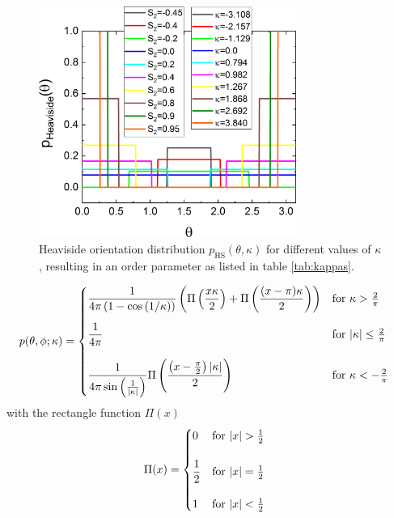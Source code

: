 \begin{figure}[htb]
\includegraphics[width=0.75\textwidth]{../images/form_factor/cylindrical_obj/pHeavisideGr.png}
\caption{Heaviside orientation distribution $p_\mathrm{HS}(\theta,\kappa)$ for different values of $\kappa$, resulting in an order parameter as listed in table \ref{tab:kappas}.}
\label{fig:pHeavisideGr}
\end{figure}


\begin{align}
p(\theta,\phi;\kappa) & =
\begin{cases}
\displaystyle
\frac{1}{4\pi\left(1-\cos\left(1/\kappa\right)\right)}\left(\Pi\left(\frac{x\kappa}{2}\right) + \Pi\left(\frac{(x-\pi)\kappa}{2}\right)\right)
 & \mathrm{for~} \kappa >  \frac{2}{\pi}
 \\[5mm]
\displaystyle
 \frac{1}{4\pi} & \mathrm{for~}  \abs{\kappa} \leq \frac{2}{\pi}
 \\[5mm]
\displaystyle
 \frac{1}{4\pi\sin\left(\frac{1}{\abs{\kappa}}\right)} \Pi\left(\frac{\left(x-\frac{\pi}{2}\right)\abs{\kappa}}{2}\right) & \mathrm{for~}  \kappa<-\frac{2}{\pi}
\end{cases}
\end{align}
with the rectangle function $\Pi(x)$
\begin{align}
\Pi(x) &=
\begin{cases}
\displaystyle
0 & \mathrm{for~} \abs{x} > \frac12
 \\[5mm]
\displaystyle
\frac12 & \mathrm{for~}  \abs{x} = \frac12
 \\[5mm]
\displaystyle
 1 & \mathrm{for~}  \abs{x} < \frac12
\end{cases}
\end{align}

